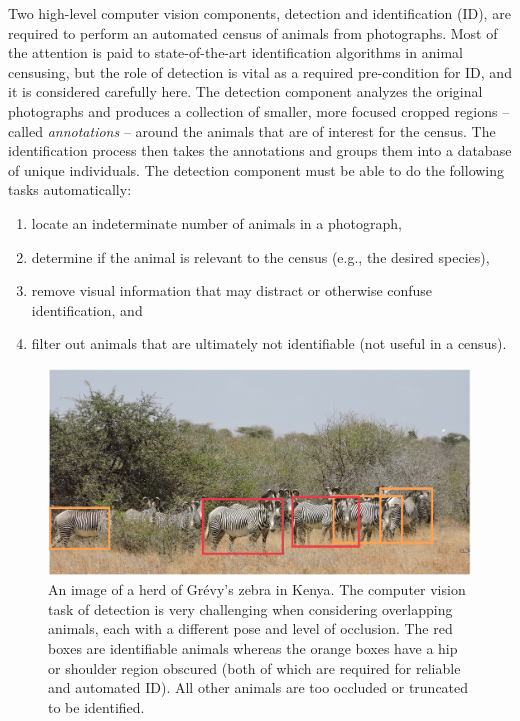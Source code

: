 Two high-level computer vision components, detection and identification (ID), are required to perform an automated census of animals from photographs.  Most of the attention is paid to state-of-the-art identification algorithms in animal censusing, but the role of detection is vital as a required pre-condition for ID, and it is considered carefully here.  The detection component analyzes the original photographs and produces a collection of smaller, more focused cropped regions -- called \textit{annotations} -- around the animals that are of interest for the census.  The identification process then takes the annotations and groups them into a database of unique individuals.  The detection component must be able to do the following tasks automatically:

\begin{enumerate}
    \item locate an indeterminate number of animals in a photograph,
    \item determine if the animal is relevant to the census (e.g., the desired species),
    \item remove visual information that may distract or otherwise confuse identification, and
    \item filter out animals that are ultimately not identifiable (not useful in a census).
\end{enumerate}

\begin{figure}[!t]
    \begin{center}
        \includegraphics[width=1.0\linewidth]{resources/clutter-annotated.pdf}
    \end{center}
    \caption{An image of a herd of Gr\'evy's zebra in Kenya.  The computer vision task of detection is very challenging when considering overlapping animals, each with a different pose and level of occlusion.  The red boxes are identifiable animals whereas the orange boxes have a hip or shoulder region obscured (both of which are required for reliable and automated ID).  All other animals are too occluded or truncated to be identified.}
    \label{fig:clutter}
\end{figure}

